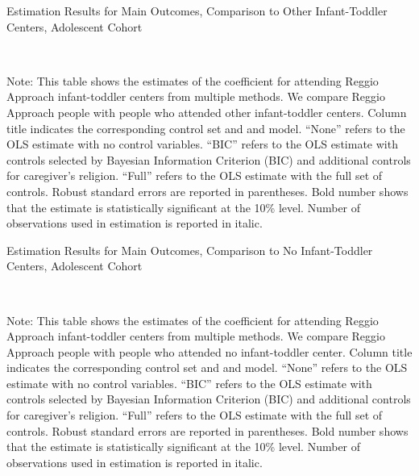 \begin{table}[H] \caption{Estimation Results for Main Outcomes, Comparison to Other  Infant-Toddler Centers, Adolescent Cohort} \label{ols-M-adol-reg-pres-asilo}
\scalebox{0.8}{}
\vspace{1ex} \\
\footnotesize\raggedright{Note: This table shows the estimates of the coefficient for attending Reggio Approach infant-toddler centers from multiple methods. We compare Reggio Approach people with people who attended other infant-toddler centers. Column title indicates the corresponding control set and and model. ``None'' refers to the OLS estimate with no control variables. ``BIC'' refers to the OLS estimate with controls selected by Bayesian Information Criterion (BIC) and additional controls for caregiver's religion. ``Full'' refers to the OLS estimate with the full set of controls. Robust standard errors are reported in parentheses. Bold number shows that the estimate is statistically significant at the 10\% level. Number of observations used in estimation is reported in italic.}
\end{table}

\begin{table}[H] \caption{Estimation Results for Main Outcomes, Comparison to No Infant-Toddler Centers, Adolescent Cohort} \label{ols-M-adol-reg-nopres-asilo}
\scalebox{0.8}{}
\vspace{1ex} \\
\footnotesize\raggedright{Note: This table shows the estimates of the coefficient for attending Reggio Approach infant-toddler centers from multiple methods. We compare Reggio Approach people with people who attended no infant-toddler center. Column title indicates the corresponding control set and and model. ``None'' refers to the OLS estimate with no control variables. ``BIC'' refers to the OLS estimate with controls selected by Bayesian Information Criterion (BIC) and additional controls for caregiver's religion. ``Full'' refers to the OLS estimate with the full set of controls. Robust standard errors are reported in parentheses. Bold number shows that the estimate is statistically significant at the 10\% level. Number of observations used in estimation is reported in italic.}
\end{table}




